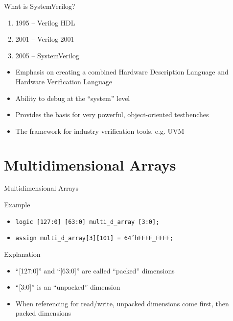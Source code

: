 \documentclass[table,dvipsnames]{beamer}
\begin{document}
\begin{frame}{What is SystemVerilog?}
	\begin{block}{}
		\begin{enumerate}
			\item 1995 -- Verilog HDL
			\item 2001 -- Verilog 2001 
			\item 2005 -- SystemVerilog
		\end{enumerate}
		\begin{itemize}
			\item Emphasis on creating a combined Hardware Description Language and Hardware Verification Language
			\item Ability to debug at the ``system'' level
			\item Provides the basis for very powerful, object-oriented testbenches
			\item The framework for industry verification tools, e.g. UVM
		\end{itemize}

	\end{block}
\end{frame}


\section{Multidimensional Arrays}
\begin{frame}{Multidimensional Arrays}
	\begin{block}{Example}
		\begin{itemize}
			\item \texttt {logic [127:0] [63:0] multi\_d\_array [3:0];}
			\item \texttt {assign multi\_d\_array[3][101] = 64'hFFFF\_FFFF;}
		\end{itemize}
	\end{block}
	\begin{block}{Explanation}
		\begin{itemize}
			\item ``[127:0]'' and ``[63:0]'' are called ``packed'' dimensions
			\item ``[3:0]'' is an ``unpacked'' dimension 
			\item When referencing for read/write, unpacked dimensions come first, then packed dimensions
		\end{itemize}
	\end{block}
\end{frame}
\end{document}
